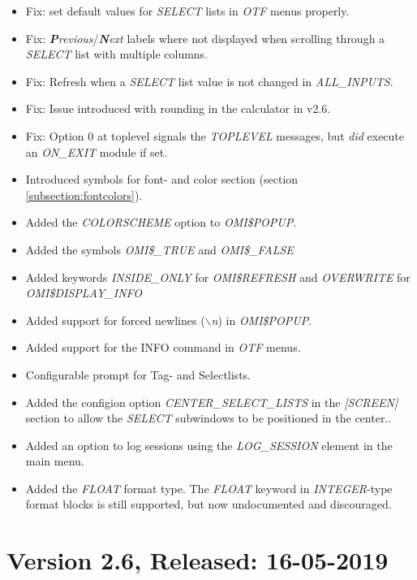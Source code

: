 \documentclass[a4paper]{book}
\begin{document}
\begin{itemize}
\item Fix: set default values for \textsl{SELECT} lists in \textsl{OTF} menus properly.
\item Fix: \textsl{\textbf{P}revious}/\textsl{\textbf{N}ext} labels where not displayed when scrolling through a \textsl{SELECT} list with multiple columns.
\item Fix: Refresh when a \textsl{SELECT} list value is not changed in \textsl{ALL{\_}INPUTS}.
\item Fix: Issue introduced with rounding in the calculator in v2.6.
\item Fix: Option \textsf{0} at toplevel signals the \textsl{TOPLEVEL} messages, but \textit{did} execute an \textsl{ON{\_}EXIT} module if set.
\item Introduced symbols for font- and color section (section \ref{subsection:fontcolors}).
\item Added the \textsl{COLORSCHEME} option to \textsl{OMI{\$}POPUP}.
\item Added the symbols \textsl{OMI{\$}{\_}TRUE} and \textsl{OMI{\$}{\_}FALSE}
\item Added keywords \textsl{INSIDE{\_}ONLY} for \textsl{OMI{\$}REFRESH} and \textsl{OVERWRITE} for \textsl{OMI{\$}DISPLAY{\_}INFO}
\item Added support for forced newlines (\textsl{\ensuremath{\backslash}n}) in \textsl{OMI{\$}POPUP}.
\item Added support for the \textsf{INFO} command in \textsl{OTF} menus.
\item Configurable prompt for Tag- and Selectlists.
\item Added the configion option \textsl{CENTER{\_}SELECT{\_}LISTS} in the \textsl{[SCREEN]} section to allow the \textsl{SELECT} subwindows to be positioned in the center..
\item Added an option to log sessions using the \textsl{LOG{\_}SESSION} element in the main menu.
\item Added the \textsl{FLOAT} format type. The \textsl{FLOAT} keyword in \textsl{INTEGER}-type format blocks is still supported, but now undocumented and discouraged.
\end{itemize}

\section*{Version 2.6, Released: 16-05-2019}
\end{document}
